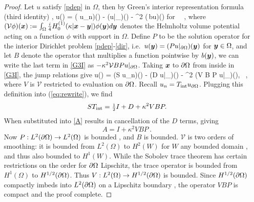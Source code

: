\documentclass[11pt,final]{amsart}
\theoremstyle{definition}
\numberwithin{remark}{section}
\numberwithin{definition}{section}
\numberwithin{pro}{section}
\begin{document}
\begin{proof}  %
Let $u$ satisfy \eqref{pdep} in $\Omega$, then
by Green's interior representation formula (third identity) \cite[Eq.~(2.4)]{coltonkress},
\be
u(\xx) = \left( u_n\right)(\xx) - \left(u|_\pO \right)(\xx)
- \kappa^2 (\,bu)(\xx)
\qquad\mbox{for}\ \xx\in \Omega
~,
\label{G3I}
\ee
where
$(\mathcal{V} \phi)(\bm{x}) :=
\int_\Omega \frac{i}{4} H^{(1)}_0(\kappa|\bm{x}-\bm{y}|) \phi(\bm{y}) d\bm{y}$ denotes
the Helmholtz volume potential \cite[Sec.~8.2]{coltonkress} acting on a function $\phi$
with support in $\Omega$.
Define $P$ to be the solution operator for the interior Dirichlet problem
\eqref{pdep}-\eqref{dir}, i.e.\ $u(\bm{y}) = (P u|_{\partial\Omega})(\bm{y})$ for $\bm{y}\in\Omega$,
and let $B$ denote the operator that multiplies a function pointwise by $b(\bm{y})$,
we can write the last term in \eqref{G3I} as $-\kappa^2 \mathcal{V} B P u|_{\partial\Omega}$.
Taking $\bm{x}$ to ${\partial\Omega}$ from inside in \eqref{G3I}, the jump relations give
\be
\half u(\xx) = \left(S u_n\right)(\xx) - \left(D u|_\pO \right)(\xx)
- \kappa^2 (V B P u|_\pO)(\xx),
\qquad\xx\in \pO
~,
\label{eq:rewrite}
\ee
where $V$ is $\mathcal{V}$ restricted to evaluation on ${\partial\Omega}$.
Recall $u_n = T_{\rm int} u_{\partial\Omega}$.  Plugging this definition into (\ref{eq:rewrite}), we find
$$
ST_{\rm int} = \mbox{\small $\frac{1}{2}$} I + D +  \kappa^2 V B P.
$$
When substituted into \eqref{A} results in cancellation of the $D$ terms, giving
$$
A = I + \kappa^2 V B P
~.
$$
Now $P: L^2({\partial\Omega})\to L^2(\Omega)$ is bounded \cite[Thm.~4.25]{mclean2000}, and $B$ is bounded.
$\mathcal{V}$ is two orders of smoothing: it is bounded from $L^2(\Omega)$ to
$H^2(W)$ for $W$ any bounded domain \cite[Thm.~8.2]{coltonkress}, and thus also bounded to $H^1(W)$.
While the Sobolev trace theorem has certain
restrictions on the order \cite[Thm.~3.38]{mclean2000} for ${\partial\Omega}$ Lipschitz,
the trace operator is bounded from $H^1(\Omega)$ to $H^{1/2}({\partial\Omega})$.
Thus $V:L^2(\Omega)\to H^{1/2}({\partial\Omega})$ is bounded.
Since $H^{1/2}({\partial\Omega})$ compactly imbeds into $L^2({\partial\Omega})$ on a Lipschitz boundary
\cite[Thm.~3.27 and p.99]{mclean2000},
the operator $VBP$ is compact and the proof complete.
\end{proof} %
\end{document}
